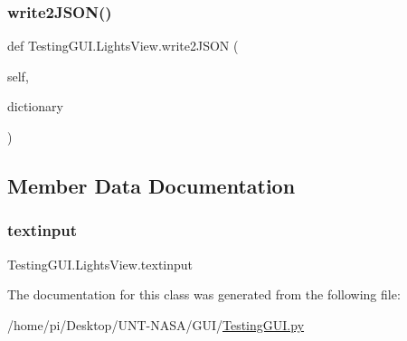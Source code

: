 \mbox{\label{classTestingGUI_1_1LightsView_a363b48af2153effb586500f5ca0f371d}} 
\subsubsection{\texorpdfstring{write2\+J\+S\+O\+N()}{write2JSON()}\hspace{0.1cm}{\footnotesize\ttfamily [2/2]}}
{\footnotesize\ttfamily def Testing\+G\+U\+I.\+Lights\+View.\+write2\+J\+S\+ON (\begin{DoxyParamCaption}\item[{}]{self,  }\item[{}]{dictionary }\end{DoxyParamCaption})}



\subsection{Member Data Documentation}
\mbox{\label{classTestingGUI_1_1LightsView_aa809676a8370b352332b15861fac843e}} 
\subsubsection{\texorpdfstring{textinput}{textinput}}
{\footnotesize\ttfamily Testing\+G\+U\+I.\+Lights\+View.\+textinput}



The documentation for this class was generated from the following file\+:\begin{DoxyCompactItemize}
\item 
/home/pi/\+Desktop/\+U\+N\+T-\/\+N\+A\+S\+A/\+G\+U\+I/\hyperlink{GUI_2TestingGUI_8py}{Testing\+G\+U\+I.\+py}\end{DoxyCompactItemize}

